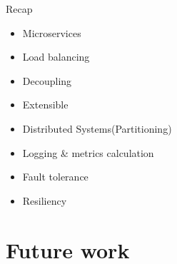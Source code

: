 \documentclass[9pt]{beamer}
\begin{document}

\begin{frame}{Recap}
  \begin{itemize}
  \item Microservices
  \item Load balancing
  \item Decoupling
  \item Extensible
  \item Distributed Systems(Partitioning)
  \item Logging \& metrics calculation
  \item Fault tolerance
  \item Resiliency
  \end{itemize}
\end{frame}


\section[Future]{Future work}
\begin{frame}[plain]
\end{frame}

\end{document}
